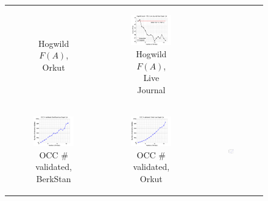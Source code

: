 \documentclass{article} %
\begin{document}
\begin{figure}[ht]
\begin{tabular}{ccc}
\begin{subfigure}[b]{0.31\textwidth}
			\caption{Hogwild $F(A)$, Orkut}
			\label{fig:diffFA_Hogwild_orkut_maxgraphcut}
	  \end{subfigure} &
	  \begin{subfigure}[b]{0.31\textwidth}
	  	\includegraphics[width=150pt]{images/diffFA_Hogwild_livejournal_maxgraphcut.png}
			\caption{Hogwild $F(A)$, Live Journal}
			\label{fig:diffFA_Hogwild_livejournal_maxgraphcut}
	  \end{subfigure} \\
	  \begin{subfigure}[b]{0.31\textwidth}
	  	\includegraphics[width=150pt]{images/validated_OCC_webberkstan_maxgraphcut.png}
			\caption{OCC \# validated, BerkStan}
			\label{fig:validated_OCC_webberkstan_maxgraphcut}
	  \end{subfigure} &
	  \begin{subfigure}[b]{0.31\textwidth}
	  	\includegraphics[width=150pt]{images/validated_OCC_orkut_maxgraphcut.png}
			\caption{OCC \# validated, Orkut}
			\label{fig:validated_OCC_orkut_maxgraphcut}
	  \end{subfigure} &
	  \begin{subfigure}[b]{0.31\textwidth}
	  	\includegraphics[width=150pt]{images/validated_OCC_livejournal_maxgraphcut.png}

\end{subfigure}
\end{tabular}
\end{figure}
\end{document}
